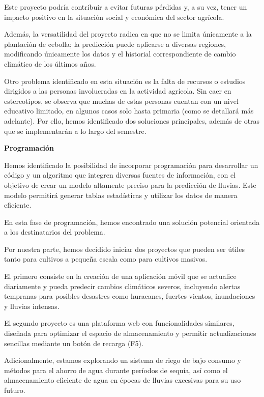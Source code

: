 \documentclass[12pt]{article}
\begin{document}
{{{Este proyecto podría contribuir a evitar futuras pérdidas y, a su vez, tener un impacto positivo en la situación social y económica del sector agrícola.

Además, la versatilidad del proyecto radica en que no se limita únicamente a la plantación de cebolla; la predicción puede aplicarse a diversas regiones, modificando únicamente los datos y el historial correspondiente de cambio climático de los últimos años.

Otro problema identificado en esta situación es la falta de recursos o estudios dirigidos a las personas involucradas en la actividad agrícola. Sin caer en estereotipos, se observa que muchas de estas personas cuentan con un nivel educativo limitado, en algunos casos solo hasta primaria (como se detallará más adelante). Por ello, hemos identificado dos soluciones principales, además de otras que se implementarán a lo largo del semestre.
	\newpage
	\begin{center}
		{\huge \textbf{Programación}}
	\end{center}
	\vspace{1cm} 
	{\large %
Hemos identificado la posibilidad de incorporar programación para desarrollar un código y un algoritmo que integren diversas fuentes de información, con el objetivo de crear un modelo altamente preciso para la predicción de lluvias. Este modelo permitirá generar tablas estadísticas y utilizar los datos de manera eficiente.

En esta fase de programación, hemos encontrado una solución potencial orientada a los destinatarios del problema.

Por nuestra parte, hemos decidido iniciar dos proyectos que pueden ser útiles tanto para cultivos a pequeña escala como para cultivos masivos.

El primero consiste en la creación de una aplicación móvil que se actualice diariamente y pueda predecir cambios climáticos severos, incluyendo alertas tempranas para posibles desastres como huracanes, fuertes vientos, inundaciones y lluvias intensas.

El segundo proyecto es una plataforma web con funcionalidades similares, diseñada para optimizar el espacio de almacenamiento y permitir actualizaciones sencillas mediante un botón de recarga (F5).

Adicionalmente, estamos explorando un sistema de riego de bajo consumo y métodos para el ahorro de agua durante períodos de sequía, así como el almacenamiento eficiente de agua en épocas de lluvias excesivas para su uso futuro.

}}}}
\end{document}
